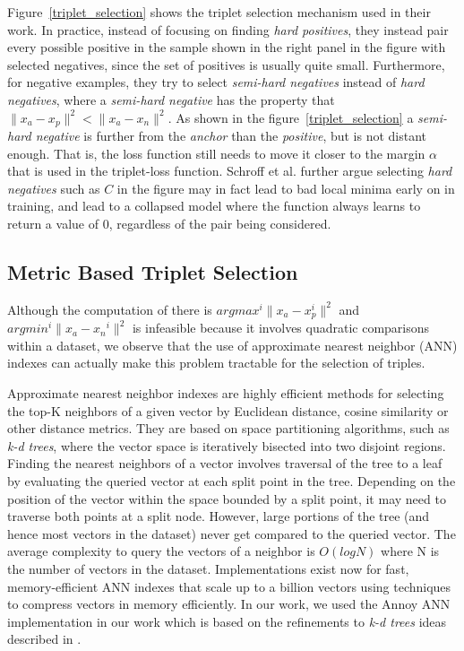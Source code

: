 Figure~\ref{triplet_selection} shows the triplet selection mechanism used in their work.  In practice, instead of focusing on finding \textit{hard positives}, they instead pair every possible positive in the sample shown in the right panel in the figure with selected negatives, since the set of positives is usually quite small.  Furthermore, for negative examples, they try to select \textit{semi-hard negatives} instead of \textit{hard negatives}, where a \textit{semi-hard negative} has the property that $\|x_a - x_p \|^2 < \|x_a - x_n \|^2$.  As shown in the figure~\ref{triplet_selection} a \textit{semi-hard negative} is further from the \textit{anchor} than the \textit{positive}, but is not distant enough.  That is, the loss function still needs to move it closer to the margin $\alpha$ that is used in the triplet-loss function.  Schroff et al. further argue selecting \textit{hard negatives} such as $C$ in the figure may in fact lead to bad local minima early on in training, and lead to a collapsed model where the function always learns to return a value of 0, regardless of the pair being considered.

\subsection{Metric Based Triplet Selection}
Although the computation of there is $argmax^i \| x_{a} - x_{p}^i \|^2$ and $argmin^i \| x_{a} - x{_n}^i \|^2$ is infeasible because it involves quadratic comparisons within a dataset, we observe that the use of approximate nearest neighbor (ANN) indexes can actually make this problem tractable for the selection of triples.  

Approximate nearest neighbor indexes are highly efficient methods for selecting the top-K neighbors of a given vector by Euclidean distance, cosine similarity or other distance metrics.  They are based on space partitioning algorithms, such as \textit{k-d trees}, where the vector space is iteratively bisected into two disjoint regions.  Finding the nearest neighbors of a vector involves traversal of the tree to a leaf by evaluating the queried vector at each split point in the tree.  Depending on the position of the vector within the space bounded by a split point, it may need to traverse both points at a split node.  However, large portions of the tree (and hence most vectors in the dataset) never get compared to the queried vector.  The average complexity to query the vectors of a neighbor is $O(log N)$ where N is the number of vectors in the dataset.  Implementations exist now for fast, memory-efficient ANN indexes that scale up to a billion vectors \cite{JDH17} using techniques to compress vectors in memory efficiently.  In our work, we used the Annoy ANN implementation \cite{annoy_git} in our work which is based on the refinements to \textit{k-d trees} ideas described in \cite{ann_paper}.

